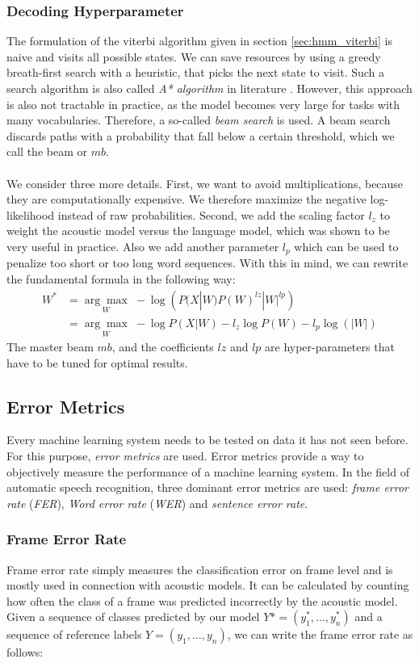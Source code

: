 \subsubsection{Decoding Hyperparameter}
\label{sec:hyperparams}
The formulation of the viterbi algorithm given in section \ref{sec:hmm_viterbi} is naive and visits all possible states. We can save resources by using a greedy breath-first search with a heuristic, that picks the next state to visit. Such a search algorithm is also called \textit{A* algorithm} in literature \cite{hart1968formal}. However, this approach is also not tractable in practice, as the model becomes very large for tasks with many vocabularies. Therefore, a so-called \textit{beam search} is used. A beam search discards paths with a probability that fall below a certain threshold, which we call the beam or $mb$. \\ \\
We consider three more details. First, we want to avoid multiplications, because they are computationally expensive. We therefore maximize the negative log-likelihood instead of raw probabilities. Second, we add the scaling factor $l_z$ to weight the acoustic model versus the language model, which was shown to be very useful in practice. Also we add another parameter $l_p$ which can be used to penalize too short or too long word sequences. With this in mind, we can rewrite the fundamental formula in the following way: 
\begin{align*}
W^* &= \underset{W}{\arg \max} \; -\log\left(P(X|W) P(W)^{lz} |W|^{lp} \right) \\
&= \underset{W}{\arg \max} \; -\log P(X|W) - l_z\log P(W) -l_p\log(|W|) 
\end{align*}
The master beam $mb$, and the coefficients $lz$ and $lp$ are hyper-parameters that have to be tuned for optimal results.

\subsection{Error Metrics}
Every machine learning system needs to be tested on data it has not seen before. For this purpose, \textit{error metrics} are used. Error metrics provide a way to objectively measure the performance of a machine learning system. In the field of automatic speech recognition, three dominant error metrics are used: \textit{frame error rate} (\textit{FER}), \textit{Word error rate} (\textit{WER}) and \textit{sentence error rate}.

\subsubsection{Frame Error Rate}
Frame error rate simply measures the classification error on frame level and is mostly used in connection with acoustic models. It can be calculated by counting how often the class of a frame was predicted incorrectly by the acoustic model. Given a sequence of classes predicted by our model $Y* = (y^*_1, ..., y^*_n)$ and a sequence of reference labels $Y = (y_1, ..., y_n)$, we can write the frame error rate as follows:

